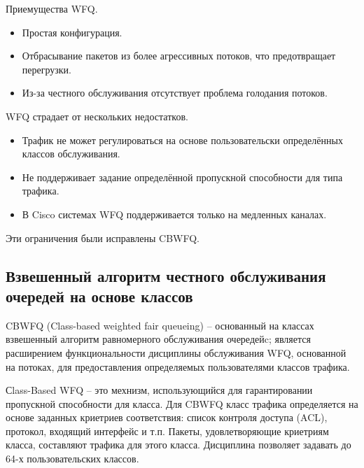     Приемущества WFQ.
    \begin{itemize}
        \item Простая конфигурация.
        \item Отбрасывание пакетов из более агрессивных потоков, что предотвращает перегрузки.
		\item Из-за честного обслуживания отсутствует проблема голодания потоков.
    \end{itemize}

    WFQ страдает от нескольких недостатков.
    \begin{itemize}
        \item Трафик не может регулироваться на основе пользовательски определённых классов обслуживания.
        \item Не поддерживает задание определённой пропускной способности для типа трафика.
		\item В Cisco системах WFQ поддерживается только на медленных каналах.\cite{wfqdis}
    \end{itemize}

    Эти ограничения были исправлены CBWFQ.

    \subsection{Взвешенный алгоритм честного обслуживания очередей на основе классов}


    CBWFQ (Class-based weighted fair queueing) -- основанный на классах взвешенный алгоритм равномерного обслуживания 
    очередейc\cite{Vagesna}; является расширением функциональности дисциплины обслуживания WFQ,
    основанной на потоках, для предоставления определяемых пользователями классов трафика. 

    Сlass-Based WFQ -- это мехнизм, использующийся для гарантировании пропускной способности
    для класса. Для CBWFQ класс трафика определяется на основе заданных криетриев
    соответствия: список контроля доступа (ACL), протокол, входящий интерфейс и т.п. Пакеты,
    удовлетворяющие криетриям класса, составляют трафика для этого класса. Дисциплина
    позволяет задавать до 64-х пользовательских классов.
		
